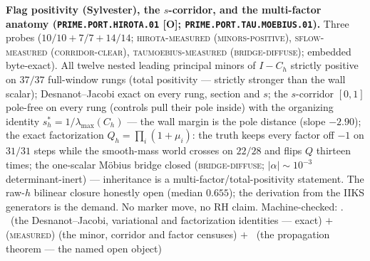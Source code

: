 \par\smallskip\noindent\textbf{Flag positivity (Sylvester), the
$s$-corridor, and the multi-factor anatomy
(\texttt{PRIME.PORT.\allowbreak HIROTA.01} [O];
\texttt{PRIME.PORT.TAU.\allowbreak MOEBIUS.01}).}
Three probes ($10/10 + 7/7 + 14/14$; \textsc{hirota-measured
(minors-positive)}, \textsc{sflow-measured (corridor-clear)},
\textsc{taumoebius-measured (bridge-diffuse)}; embedded
byte-exact).  All twelve nested leading principal minors of $I
- C_h$ strictly positive on $37/37$ full-window rungs (total
positivity --- strictly stronger than the wall scalar);
Desnanot--Jacobi exact on every rung, section and $s$; the
$s$-corridor $[0, 1]$ pole-free on every rung (controls pull
their pole inside) with the organizing identity $s^{*}_h =
1/\lambda_{\max}(C_h)$ --- the wall margin is the pole distance
(slope $-2.90$); the exact factorization $Q_h = \prod_i(1 +
\mu_i)$: the truth keeps every factor off $-1$ on $31/31$ steps
while the smooth-mass world crosses on $22/28$ and flips $Q$
thirteen times; the one-scalar M\"obius bridge closed
(\textsc{bridge-diffuse}; $|\alpha| \sim 10^{-3}$
determinant-inert) --- inheritance is a
multi-factor/total-positivity statement.  The raw-$h$ bilinear
closure honestly open (median $0.655$); the derivation from the
IIKS generators is the demand.  No marker move, no RH claim.
Machine-checked: .
\mE\ (the Desnanot--Jacobi, variational and factorization
identities --- exact) $+$ (\textsc{measured}) (the minor,
corridor and factor censuses) $+$ \mO\ (the propagation theorem
--- the named open object)
\par\smallskip


